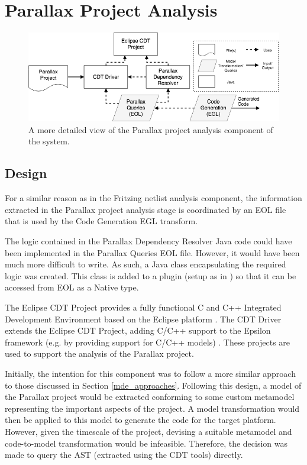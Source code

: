 \documentclass{UoYCSproject}
\begin{document}
\section{Parallax Project Analysis} \label{parallax_design}
\begin{figure}[h!]
  \centering
  \includegraphics[width=0.8\linewidth]{graphics/parallax_project_analysis.png}
  \caption{A more detailed view of the Parallax project analysis component of the system.}
  \label{fig:parallax_analysis}
\end{figure}

\subsection{Design}
For a similar reason as in the Fritzing netlist analysis component, the information extracted in the Parallax project analysis stage is coordinated by an EOL file that is used by the Code Generation EGL transform. 

The logic contained in the Parallax Dependency Resolver Java code could have been implemented in the Parallax Queries EOL file. However, it would have been much more difficult to write. As such, a Java class encapsulating the required logic was created. This class is added to a plugin (setup as in \parencite{eol_tool}) so that it can be accessed from EOL as a Native type.

The Eclipse CDT Project provides a fully functional C and C++ Integrated Development Environment based on the Eclipse platform \parencite{eclipse_cdt}. The CDT Driver extends the Eclipse CDT Project, adding C/C++ support to the Epsilon framework (e.g. by providing support for C/C++ models) \parencite{cdt_driver}. These projects are used to support the analysis of the Parallax project.

Initially, the intention for this component was to follow a more similar approach to those discussed in Section \ref{mde_approaches}. Following this design, a model of the Parallax project would be extracted conforming to some custom metamodel representing the important aspects of the project. A model transformation would then be applied to this model to generate the code for the target platform. However, given the timescale of the project, devising a suitable metamodel and code-to-model transformation would be infeasible. Therefore, the decision was made to query the AST (extracted using the CDT tools) directly.
\end{document}
